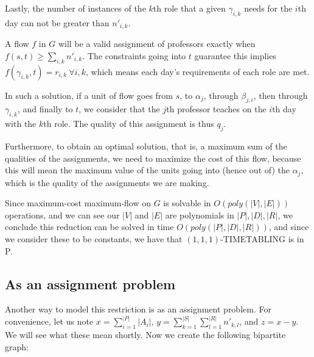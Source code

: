 Lastly, the number of instances of the $k$th role that a given $\gamma_{i, k}$ needs for the $i$th day can not be greater than $n'_{i, k}$.

A flow $f$ in $G$ will be a valid assignment of professors exactly when $f(s, t) \ge \sum_{i, k} n'_{i, k}$. The constraints going into $t$ guarantee this implies $f(\gamma_{i, k}, t) = r_{i, k}\ \forall i, k$, which means each day's requirements of each role are met.

In such a solution, if a unit of flow goes from $s$, to $\alpha_j$, through $\beta_{j, i}$, then through $\gamma_{i, k}$, and finally to $t$, we consider that the $j$th professor teaches on the $i$th day with the $k$th role. The quality of this assignment is thus $q_j$.

Furthermore, to obtain an optimal solution, that is, a maximum sum of the qualities of the assignments, we need to maximize the cost of this flow, because this will mean the maximum value of the units going into (hence out of) the $\alpha_j$, which is the quality of the assignments we are making.

Since maximum-cost maximum-flow on $G$ is solvable in $O(poly(|V|, |E|))$ operations, and we can see our $|V|$ and $|E|$ are polynomials in $|P|, |D|, |R|$, we conclude this reduction can be solved in time $O(poly(|P|, |D|, |R|))$, and since we consider these to be constants, we have that $(1, 1, 1)$-TIMETABLING is in \textsc{P}.

\subsection{As an assignment problem}

Another way to model this restriction is as an assignment problem. For convenience, let us note $x = \sum_{i = 1}^{|P|} |A_i|$, $y = \sum_{k = 1}^{|S|} \sum_{l = 1}^{|R|} n'_{k, l}$, and $z = x - y$. We will see what these mean shortly. Now we create the following bipartite graph:

\begin{center}
\end{center}

